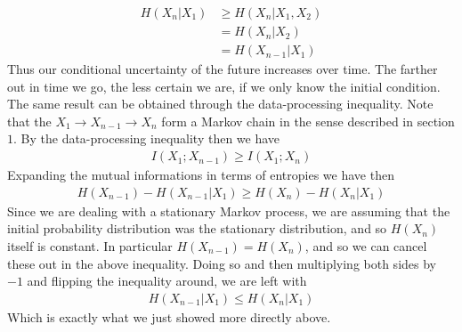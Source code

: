 \begin{align}
	H(X_n|X_1) &\geq H(X_n|X_1,X_2) \\
				&= H(X_n|X_2) \\
				&= H(X_{n-1}|X_1)
\end{align}
Thus our conditional uncertainty of the future increases over time. The farther out in time we go, the less certain we are, if we only know the initial condition. The same result can be obtained through the data-processing inequality. Note that the $X_1 \to X_{n-1} \to X_n$ form a Markov chain in the sense described in section $1$. By the data-processing inequality then we have 
\begin{align}
	I(X_1;X_{n-1}) \geq I(X_1;X_n)
\end{align}
Expanding the mutual informations in terms of entropies we have then
\begin{align}
	H(X_{n-1}) - H(X_{n-1}|X_1) \geq H(X_n) - H(X_n|X_1)
\end{align}
Since we are dealing with a stationary Markov process, we are assuming that the initial probability distribution was the stationary distribution, and so $H(X_n)$ itself is constant. In particular $H(X_{n-1}) = H(X_n)$, and so we can cancel these out in the above inequality. Doing so and then multiplying both sides by $-1$ and flipping the inequality around, we are left with
\begin{align}
	H(X_{n-1}|X_1) \leq H(X_n|X_1)
\end{align} 
Which is exactly what we just showed more directly above. 

